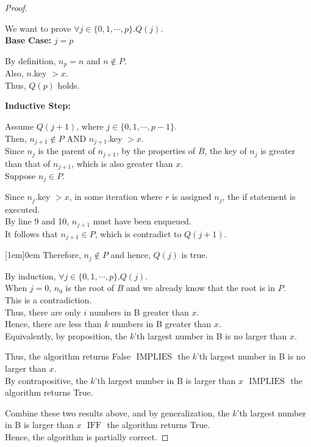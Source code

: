 \documentclass[10pt]{article}
\newcommand{\iimplies}{\mbox{ IMPLIES }}
\newcommand{\aand}{\mbox{ AND }}
\newcommand{\iiff}{\mbox{ IFF }}
\begin{document}
\begin{enumerate}
\begin{proof}
\begin{addmargin}[1em]{0em}
  We want to prove $\forall j \in \{0, 1, \cdots, p\}. Q(j)$.  \\
  \textbf{Base Case:} $j = p$
  \begin{addmargin}[1em]{0em}
    By definition, $n_p = n$ and $n \notin P$. \\
    Also, $n$.key $> x$. \\
    Thus, $Q(p)$ holds.
  \end{addmargin}
  \textbf{Inductive Step:}
  \begin{addmargin}[1em]{0em}
    Assume $Q(j+1)$, where $j \in \{0, 1, \cdots , p-1 \}$. \\
    Then, $n_{j+1} \notin P \aand n_{j+1}$.key $> x$. \\
    Since $n_{j}$ is the parent of $n_{j+1}$, by the properties of $B$, the key of $n_{j}$ is greater than that of $n_{j+1}$, which is also greater than $x$. \\
    Suppose $n_{j} \in P$. \\
    \begin{addmargin}[1em]{0em}
      Since $n_{j}$.key $> x$, in some iteration where $r$ is assigned $n_{j}$, the if statement is executed. \\
      By line 9 and 10, $n_{j+1}$ must have been enqueued. \\
      It follows that $n_{j+1} \in P$, which is contradict to $Q(j+1)$.
    \end{addmargin}[1em]{0em}
    Therefore, $n_{j} \notin P$ and hence, $Q(j)$ is true.
  \end{addmargin}
  By induction, $\forall j \in \{0, 1, \cdots, p\}. Q(j)$. \\
  When $j = 0$, $n_0$ is the root of $B$ and we already know that the root is in $P$. \\
  This is a contradiction. \\
  Thus, there are only $i$ numbers in B greater than $x$. \\
  Hence, there are less than $k$ numbers in B greater than $x$. \\
  Equivalently, by proposition, the $k$'th largest number in B is no larger than $x$.
\end{addmargin}

Thus, the algorithm returns False $\iimplies$ the $k$'th largest number in B is no larger than $x$. \\
By contrapositive, the $k$'th largest number in B is larger than $x$ $\iimplies$ the algorithm returns True. 

Combine these two results above, and by generalization,  the $k$'th largest number in B is larger than $x$ $\iiff$ the algorithm returns True. \\
Hence, the algorithm is partially correct.
\end{proof}


\end{enumerate}
\end{document}

